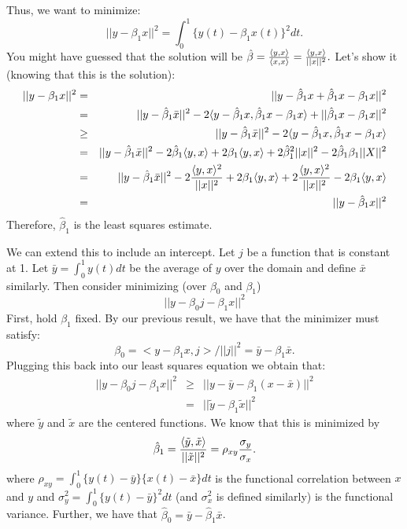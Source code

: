 Thus, we want to minimize:
$$
|| y - \beta_1 x ||^2 = 
\int_0^1 \{y(t) - \beta_1 x(t)\}^2 dt.
$$
You might have guessed that the solution will be $\hat \beta = \frac{\langle y, x \rangle}{\langle x, x \rangle} = \frac{\langle y, x \rangle}{||x||^2}.$
Let's show it (knowing that this is the solution):
\begin{eqnarray*}
|| y - \beta_1 x ||^2 & = & 
|| y - \hat \beta_1 x + \hat \beta_1 x  - \beta_1 x ||^2 \\
& = & || y - \hat \beta_1 \bar x ||^2
- 2 \ip{ y - \hat \beta_1 x }{\hat \beta_1 x - \beta_1 x}
+ ||\hat \beta_1 x - \beta_1 x||^2 \\
& \geq & 
|| y - \hat \beta_1 \bar x ||^2
- 2 \ip{ y - \hat \beta_1 x}{\hat \beta_1 x - \beta_1 x}\\
& = & || y - \hat \beta_1 \bar x ||^2
- 2 \hat \beta_1 \ip{y}{x} + 2 \beta_1 \ip{y}{x} + 2
\hat \beta_1^2 ||x||^2 - 2 \hat \beta_1 \beta_1 ||X||^2 \\
& = & || y - \hat \beta_1 \bar x ||^2 %
-  2 \frac{\ip{y}{x}^2}{||x||^2} + 2 \beta_1 \ip{y}{x} %
+ 2 \frac{\ip{y}{x}^2}{||x||^2} %
- 2 \beta_1 \ip{y}{x} \\
& = & || y - \hat \beta_1  x ||^2
\end{eqnarray*}
Therefore, $\hat \beta_1$ is the least squares estimate.

We can extend this to include an intercept. Let $j$ be a function
that is constant at 1. 
Let $\bar y = \int_0^1 y(t)dt$ be the average of $y$ over
the domain and define $\bar x$ similarly.
Then consider minimizing (over $\beta_0$ and $\beta_1$)
$$
|| y - \beta_0 j - \beta_1 x ||^2
$$
First, hold $\beta_1$ fixed. By our previous result, we
have that the minimizer must satisfy:
$$
\beta_0 = <y - \beta_1 x, j> / ||j||^2 = 
\bar y - \beta_1 \bar x.
$$
Plugging this back into our least squares equation we
obtain that:
\begin{eqnarray*}
|| y - \beta_0 j - \beta_1 x ||^2 & \geq &
|| y - \bar y - \beta_1 (x - \bar x)||^2 \\
& = & || \tilde y - \beta_1 \tilde x||^2
\end{eqnarray*}
where $\tilde y$ and $\tilde x$ are the centered functions.  
We know that this is minimized by
$$
\hat \beta_1 = \frac{\langle \tilde y, \tilde x \rangle}{||\tilde x||^2} = \rho_{xy}\frac{\sigma_y}{\sigma_x}.
$$
where $\rho_{xy} = \int_0^1 \{y(t) - \bar y\} \{x(t) - \bar x\} dt$ is the
functional correlation between $x$ and $y$ and $\sigma_y^2 =
\int_0^1 \{y(t) - \bar y\}^2 dt$ (and $\sigma_x^2$ is defined similarly) is the functional variance.
Further, we have that $\hat \beta_0 = \bar y - \hat \beta_1 \bar x$.

